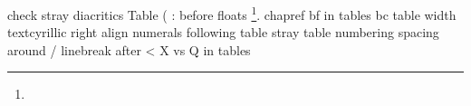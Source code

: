 check stray diacritics
Table (
: before floats
\footnote{}.
chapref
bf in tables
bc table width
textcyrillic
right align numerals
following table
stray table numbering
spacing around /
linebreak after <
X vs Q in tables